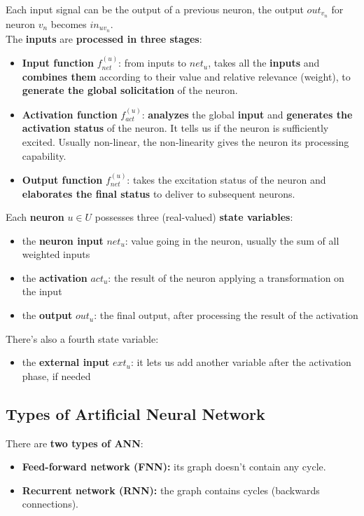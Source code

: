\documentclass[11pt]{article}
\begin{document}
		Each input signal can be the output of a previous neuron, the output $out_{v_n}$ for neuron $v_n$ becomes $in_{uv_n}$.\\
		
		The \textbf{inputs} are \textbf{processed in three stages}: 
		\begin{itemize}
			\item \textbf{Input function} $f^{(u)}_{net}$: from inputs to $net_u$, takes all the \textbf{inputs} and \textbf{combines them} according to their value and relative relevance (weight), to \textbf{generate the global solicitation} of the neuron.\\
			
			\item \textbf{Activation function} $f^{(u)}_{act}$: \textbf{analyzes} the global \textbf{input} and \textbf{generates the activation status} of the neuron. It tells us if the neuron is sufficiently excited. Usually non-linear, the non-linearity gives the neuron its processing capability.\\
			
			\item \textbf{Output function} $f^{(u)}_{net}$: takes the excitation status of the neuron and \textbf{elaborates the final status} to deliver to subsequent neurons.\\
			
		\end{itemize}
		
		Each \textbf{neuron} $u \in U$ possesses three (real-valued) \textbf{state variables}:
		\begin{itemize}
			\item the \textbf{neuron input} $net_u$: value going in the neuron, usually the sum of all weighted inputs 
			\item the \textbf{activation} $act_u$: the result of the neuron applying a transformation on the input
			\item the \textbf{output} $out_u$: the final output, after processing the result of the activation
		\end{itemize}
		There's also a fourth state variable: 
		\begin{itemize}
			\item the \textbf{external input} $ext_u$: it lets us add another variable after the activation phase, if needed
		\end{itemize}
		
		\newpage
		
		\subsection{Types of Artificial Neural Network}
		There are \textbf{two types of ANN}: 
		\begin{itemize}
			\item \textbf{Feed-forward network (FNN):} its graph doesn't contain any cycle.\\
			
			\item \textbf{Recurrent network (RNN):} the graph contains cycles (backwards connections).\\
		\end{itemize}
		
\end{document}
